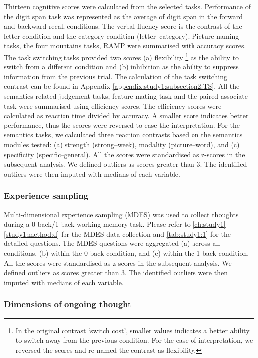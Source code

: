 Thirteen cognitive scores were calculated from the selected tasks. Performance of the digit span task was represented as the average of digit span in the forward and backward recall conditions. The verbal fluency score is the contrast of the letter condition and the category condition (letter--category). Picture naming tasks, the four mountains tasks, RAMP were summarised with accuracy scores. The task switching tasks provided two scores (a) flexibility
\footnote{
In the original contrast `switch cost', smaller values indicates a better ability to switch away from the previous condition. For the ease of interpretation, we reversed the scores and re-named the contrast as flexibility.}
as the ability to switch from a different condition and (b) inhibition as the ability to suppress information from the previous trial. The calculation of the task switching contrast can be found in Appendix \ref{appendix:study1:subsection2:TS}. All the semantics related judgement tasks, feature mating task and the paired associate task were summarised using efficiency scores. The efficiency scores were calculated as reaction time divided by accuracy. A smaller score indicates better performance, thus the scores were reversed to ease the interpretation. For the semantics tasks, we calculated three reaction contrasts based on the semantics modules tested: (a) strength (strong--week), modality (picture--word), and (c) specificity (specific--general). All the scores were standardised as z-scores in the subsequent analysis. We defined outliers as scores greater than 3. The identified outliers were then imputed with medians of each variable. 

\subsubsection{Experience sampling}
\label{study3:method:e:mdes}
Multi-dimensional experience sampling (MDES) was used to collect thoughts during a 0-back/1-back working memory task. Please refer to \cref{ch:study1} \cref{study1:method:d} for the MDES data collection and \cref{tab:study1:1} for the detailed questions. The MDES questions were aggregated (a) across all conditions, (b) within the 0-back condition, and (c) within the 1-back condition. All the scores were standardised as z-scores in the subsequent analysis. We defined outliers as scores greater than 3. The identified outliers were then imputed with medians of each variable.


\subsubsection{Dimensions of ongoing thought}

